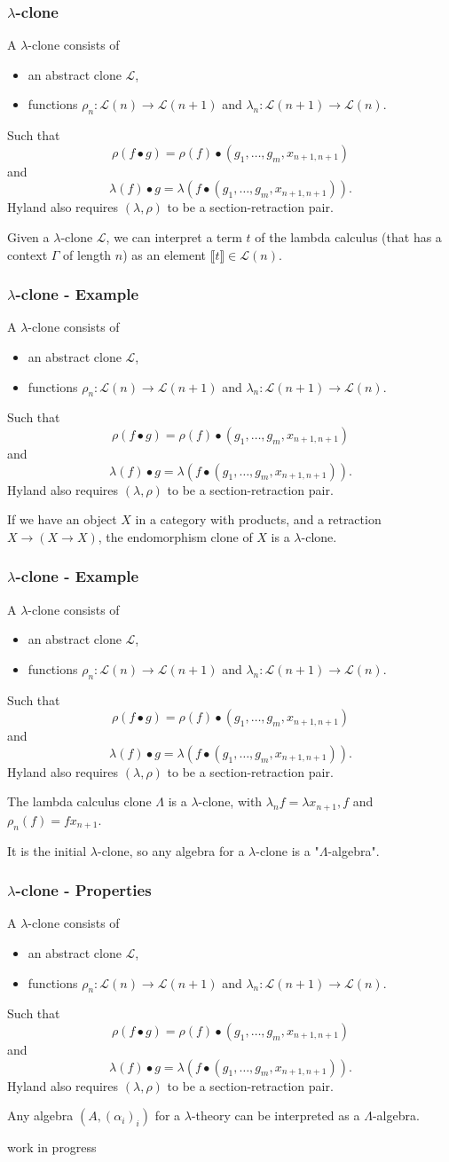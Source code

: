 \documentclass[aspectratio=169]{fancyslides} %
\newcommand\lambdaCloneDefinition{
  \begin{definition}
    A $ \lambda $-clone consists of
    \begin{itemize}
      \item an abstract clone $ \mathcal L $,
      \item functions $ \rho_n: \mathcal L(n) \to \mathcal L(n + 1) $ and $ \lambda_n: \mathcal L(n + 1) \to \mathcal L(n) $.
    \end{itemize}
    Such that
    \[ \rho(f \bullet g) = \rho(f) \bullet (g_1, \dots, g_m, x_{n+1, n+1}) \]
    and
    \[ \lambda(f) \bullet g = \lambda(f \bullet (g_1, \dots, g_m, x_{n+1, n+1})). \]
    Hyland also requires $ (\lambda, \rho) $ to be a section-retraction pair.
  \end{definition}
}
\begin{document}
  \begin{frame}
    \frametitle{$ \lambda $-clone}

    \lambdaCloneDefinition

    Given a $ \lambda $-clone $ \mathcal L $, we can interpret a term $ t $ of the lambda calculus (that has a context $ \Gamma $ of length $ n $) as an element $ \llbracket t \rrbracket \in \mathcal L(n) $.
  \end{frame}

  \begin{frame}
    \frametitle{$ \lambda $-clone - Example}

    \lambdaCloneDefinition

    \begin{example}
      If we have an object $ X $ in a category with products, and a retraction $ X \to (X \to X) $, the endomorphism clone of $ X $ is a $ \lambda $-clone.
    \end{example}
  \end{frame}

  \begin{frame}
    \frametitle{$ \lambda $-clone - Example}

    \lambdaCloneDefinition

    \begin{example}
      The lambda calculus clone $ \Lambda $ is a $ \lambda $-clone, with $ \lambda_n f = \lambda x_{n + 1}, f $ and $ \rho_n(f) = f x_{n + 1} $.

      It is the initial $ \lambda $-clone, so any algebra for a $ \lambda $-clone is a "$ \Lambda $-algebra".
    \end{example}
  \end{frame}

  \begin{frame}
    \frametitle{$ \lambda $-clone - Properties}

    \lambdaCloneDefinition

    Any algebra $ (A, (\alpha_i)_i) $ for a $ \lambda $-theory can be interpreted as a $ \Lambda $-algebra.
  \end{frame}

  \begin{frame}
    work in progress
  \end{frame}
\end{document}
